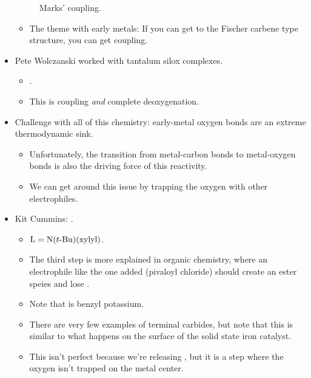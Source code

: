 \documentclass[../notes.tex]{subfiles}
\begin{document}
\begin{itemize}
\begin{figure}[h!]
        \caption{Marks'  coupling.}
        \label{fig:CCcoupling-Marks}
    \end{figure}
    \begin{itemize}
        \item The theme with early metals: If you can get to the Fischer carbene type structure, you can get coupling.
    \end{itemize}
    \item Pete Wolczanski worked with tantalum silox complexes.
    \begin{itemize}
        \item {}.
        \item This is  coupling \emph{and} complete deoxygenation.
    \end{itemize}
    \item Challenge with all of this chemistry: early-metal oxygen bonds are an extreme thermodynamic sink.
    \begin{itemize}
        \item Unfortunately, the transition from metal-carbon bonds to metal-oxygen bonds is also the driving force of this reactivity.
        \item We can get around this issue by trapping the oxygen with other electrophiles.
    \end{itemize}
    \item Kit Cummins: .
    \begin{itemize}
        \item $\ce{L}=\ce{N($t${-}Bu)({xylyl})}$.
        \item The third step is more explained in organic chemistry, where an electrophile like the one added (pivaloyl chloride) should create an ester speies and lose .
        \item Note that  is benzyl potassium.
        \item There are very few examples of terminal carbides, but note that this is similar to what happens on the surface of the solid state iron catalyst.
        \item This isn't perfect because we're releasing , but it is a step where the oxygen isn't trapped on the metal center.
    \end{itemize}

\end{itemize}
\end{document}
